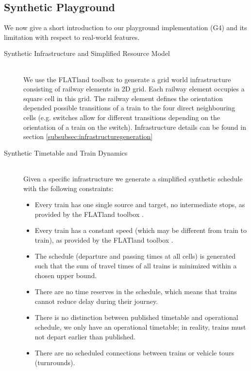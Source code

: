 \documentclass{article}
\begin{document}
\subsection{Synthetic Playground}\label{subsec:playground}

We now give a short introduction to our playground implementation (G4) and its limitation with respect to real-world features.
\begin{description}
\item[Synthetic Infrastructure and Simplified Resource Model] \hfill \\
We use the FLATland toolbox \cite{aicrowdFLATland} to generate a grid world infrastructure consisting of railway elements in 2D grid. Each railway element occupies a square cell in this grid. The railway element defines the orientation depended possible transitions of a train to the four direct neighbouring cells (e.g. switches allow for different transitions depending on the orientation of a train on the switch). Infrastructure details can be found in section \ref{subsubsec:infrastructuregeneration}
\item[Synthetic Timetable and Train Dynamics] \hfill \\
Given a specific infrastructure we generate a simplified synthetic schedule with the following constraints:
\begin{itemize}
    \item Every train has one single source and target, no intermediate stops, as provided by the FLATland toolbox \cite{aicrowdFLATland}.
    \item Every train has a constant speed (which may be different from train to train), as provided by the FLATland toolbox \cite{aicrowdFLATland}.
    \item The schedule (departure and passing times at all cells) is generated such that the sum of travel times of all trains is minimized within a chosen upper bound.
    \item There are no time reserves in the schedule, which means that trains cannot reduce delay during their journey.
    \item There is no distinction between published timetable and operational schedule, we only have an operational timetable; in reality, trains must not depart earlier than published.
    \item There are no scheduled connections between trains or vehicle tours (turnrounds).

\end{itemize}
\end{description}
\end{document}
